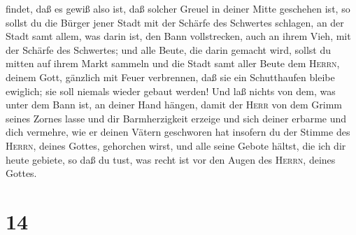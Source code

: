findet, daß es gewiß also ist, daß solcher Greuel in deiner Mitte
geschehen ist,  so sollst du die Bürger jener Stadt mit
der Schärfe des Schwertes schlagen, an der Stadt samt allem, was darin
ist, den Bann vollstrecken, auch an ihrem Vieh, mit der Schärfe des
Schwertes;  und alle Beute, die darin gemacht wird,
sollst du mitten auf ihrem Markt sammeln und die Stadt samt aller Beute
dem \textsc{Herrn}, deinem Gott, gänzlich mit Feuer verbrennen, daß sie
ein Schutthaufen bleibe ewiglich; sie soll niemals wieder gebaut werden!
 Und laß nichts von dem, was unter dem Bann ist, an
deiner Hand hängen, damit der \textsc{Herr} von dem Grimm seines Zornes
lasse und dir Barmherzigkeit erzeige und sich deiner erbarme und dich
vermehre, wie er deinen Vätern geschworen hat  insofern
du der Stimme des \textsc{Herrn}, deines Gottes, gehorchen wirst, und
alle seine Gebote hältst, die ich dir heute gebiete, so daß du tust, was
recht ist vor den Augen des \textsc{Herrn}, deines Gottes.

\hypertarget{section-13}{%
\section{14}\label{section-13}}

